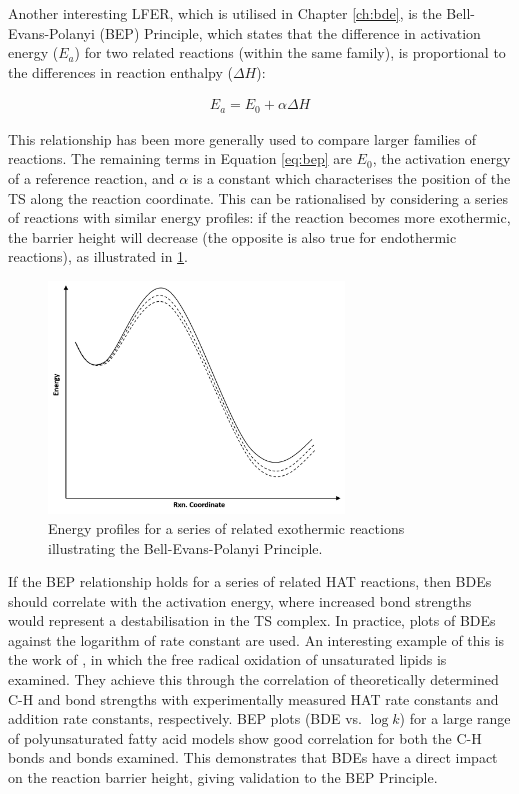 Another interesting LFER, which is utilised in Chapter \ref{ch:bde}, is the
Bell-Evans-Polanyi (BEP) Principle,\cite{Bell1936,Evans1938} which states that
the difference in activation energy ($E_a$) for two related reactions (within
the same family), is proportional to the differences in reaction enthalpy
($\Delta H$):

\begin{align}
  E_a = E_0 + \alpha \Delta H
  \label{eq:bep}
\end{align}

\noindent This relationship has been more generally used to compare larger
families of reactions. The remaining terms in Equation \ref{eq:bep} are $E_0$,
the activation energy of a reference reaction, and $\alpha$ is a constant which
characterises the position of the TS along the reaction coordinate. This can be
rationalised by considering a series of reactions with similar energy profiles:
if the reaction becomes more exothermic, the barrier height will decrease (the
opposite is also true for endothermic reactions), as illustrated in
\ref{fig:bep}.

\begin{figure}[htb]
  \centering
  \includegraphics[width=0.7\textwidth]{figures/bep}
  \caption{Energy profiles for a series of related exothermic reactions
    illustrating the Bell-Evans-Polanyi Principle.}
  \label{fig:bep}
\end{figure}

If the BEP relationship holds for a series of related HAT reactions, then BDEs
should correlate with the activation energy, where increased bond strengths
would represent a destabilisation in the TS complex. In practice, plots of BDEs
against the logarithm of rate constant are used. An interesting example of this
is the work of \citet{Pratt2003}, in which the free radical oxidation of
unsaturated lipids is examined. They achieve this through the correlation of
theoretically determined C-H and  bond strengths with experimentally
measured HAT rate constants and  addition rate constants,
respectively. BEP plots (BDE vs. $\log k$) for a large range of polyunsaturated
fatty acid models show good correlation for both the C-H bonds and 
bonds examined. This demonstrates that BDEs have a direct impact on the reaction
barrier height, giving validation to the BEP Principle.


